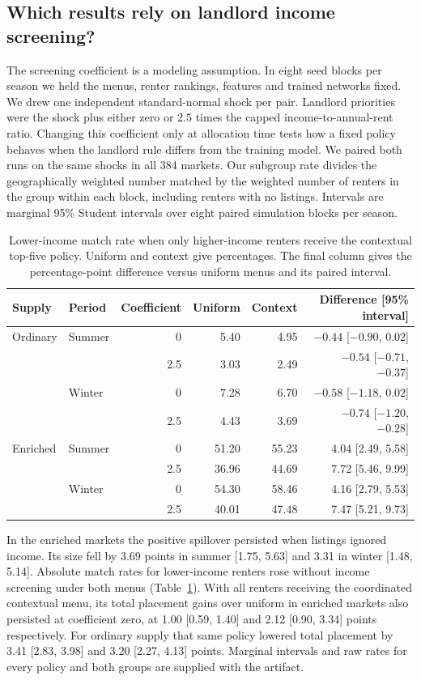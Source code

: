 \subsection{Which results rely on landlord income screening?}
\label{app:income-stress}
The screening coefficient is a modeling assumption. In eight seed blocks per season we held the menus, renter rankings, features and trained networks fixed. We drew one independent standard-normal shock per pair. Landlord priorities were the shock plus either zero or $2.5$ times the capped income-to-annual-rent ratio. Changing this coefficient only at allocation time tests how a fixed policy behaves when the landlord rule differs from the training model. We paired both runs on the same shocks in all 384 markets. Our subgroup rate divides the geographically weighted number matched by the weighted number of renters in the group within each block, including renters with no listings. Intervals are marginal 95\% Student intervals over eight paired simulation blocks per season.

\begin{table}[t]
\centering\small
\caption{Lower-income match rate when only higher-income renters receive the contextual top-five policy. Uniform and context give percentages. The final column gives the percentage-point difference versus uniform menus and its paired interval.}
\label{tab:screen-stress}
\begin{tabular}{llrrrr}
\toprule
Supply & Period & Coefficient & Uniform & Context & Difference [95\% interval]\\
\midrule
Ordinary & Summer & 0 & 5.40 & 4.95 & $-0.44$ [$-0.90$, $0.02$]\\
 & & 2.5 & 3.03 & 2.49 & $-0.54$ [$-0.71$, $-0.37$]\\
 & Winter & 0 & 7.28 & 6.70 & $-0.58$ [$-1.18$, $0.02$]\\
 & & 2.5 & 4.43 & 3.69 & $-0.74$ [$-1.20$, $-0.28$]\\
Enriched & Summer & 0 & 51.20 & 55.23 & 4.04 [2.49, 5.58]\\
 & & 2.5 & 36.96 & 44.69 & 7.72 [5.46, 9.99]\\
 & Winter & 0 & 54.30 & 58.46 & 4.16 [2.79, 5.53]\\
 & & 2.5 & 40.01 & 47.48 & 7.47 [5.21, 9.73]\\
\bottomrule
\end{tabular}
\end{table}

In the enriched markets the positive spillover persisted when listings ignored income. Its size fell by 3.69 points in summer [1.75, 5.63] and 3.31 in winter [1.48, 5.14]. Absolute match rates for lower-income renters rose without income screening under both menus (Table~\ref{tab:screen-stress}). With all renters receiving the coordinated contextual menu, its total placement gains over uniform in enriched markets also persisted at coefficient zero, at 1.00 [0.59, 1.40] and 2.12 [0.90, 3.34] points respectively. For ordinary supply that same policy lowered total placement by 3.41 [2.83, 3.98] and 3.20 [2.27, 4.13] points. Marginal intervals and raw rates for every policy and both groups are supplied with the artifact.
